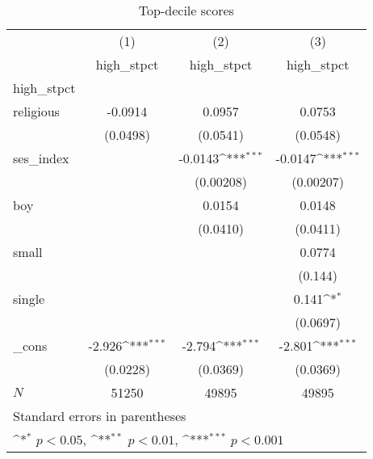 \begin{table}[htbp]\centering
\def\sym#1{\ifmmode^{#1}\else\(^{#1}\)\fi}
\caption{Top-decile scores}
\begin{tabular}{l*{3}{c}}
\hline\hline
            &\multicolumn{1}{c}{(1)}&\multicolumn{1}{c}{(2)}&\multicolumn{1}{c}{(3)}\\
            &\multicolumn{1}{c}{high\_stpct}&\multicolumn{1}{c}{high\_stpct}&\multicolumn{1}{c}{high\_stpct}\\
\hline
high\_stpct  &                     &                     &                     \\
religious   &     -0.0914         &      0.0957         &      0.0753         \\
            &    (0.0498)         &    (0.0541)         &    (0.0548)         \\
[1em]
ses\_index   &                     &     -0.0143\sym{***}&     -0.0147\sym{***}\\
            &                     &   (0.00208)         &   (0.00207)         \\
[1em]
boy         &                     &      0.0154         &      0.0148         \\
            &                     &    (0.0410)         &    (0.0411)         \\
[1em]
small       &                     &                     &      0.0774         \\
            &                     &                     &     (0.144)         \\
[1em]
single      &                     &                     &       0.141\sym{*}  \\
            &                     &                     &    (0.0697)         \\
[1em]
\_cons      &      -2.926\sym{***}&      -2.794\sym{***}&      -2.801\sym{***}\\
            &    (0.0228)         &    (0.0369)         &    (0.0369)         \\
\hline
\(N\)       &       51250         &       49895         &       49895         \\
\hline\hline
\multicolumn{4}{l}{\footnotesize Standard errors in parentheses}\\
\multicolumn{4}{l}{\footnotesize \sym{*} \(p<0.05\), \sym{**} \(p<0.01\), \sym{***} \(p<0.001\)}\\
\end{tabular}
\end{table}
